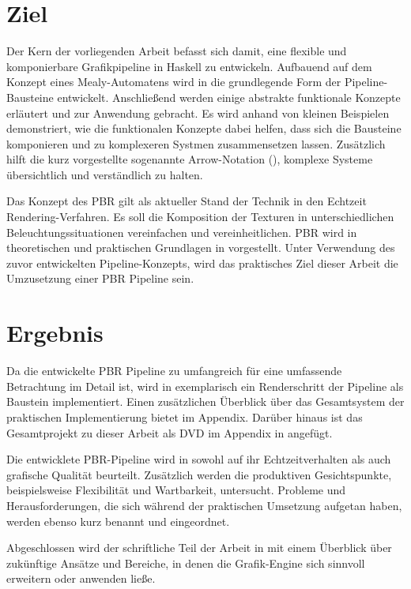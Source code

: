 \section{Ziel}

Der Kern der vorliegenden Arbeit befasst sich damit, eine flexible und komponierbare Grafikpipeline in Haskell zu entwickeln. Aufbauend auf dem Konzept eines Mealy-Automatens wird in  die grundlegende Form der Pipeline-Bausteine entwickelt. Anschließend werden einige abstrakte funktionale Konzepte erläutert und zur Anwendung gebracht. Es wird anhand von kleinen Beispielen demonstriert, wie die funktionalen Konzepte dabei helfen, dass sich die Bausteine komponieren und zu komplexeren Systmen zusammensetzen lassen. Zusätzlich hilft die kurz vorgestellte sogenannte Arrow-Notation (), komplexe Systeme übersichtlich und verständlich zu halten.

Das Konzept des \acl{PBR} gilt als aktueller Stand der Technik in den Echtzeit Rendering-Verfahren. Es soll die Komposition der Texturen in unterschiedlichen Beleuchtungssituationen vereinfachen und vereinheitlichen. \ac{PBR} wird in theoretischen und praktischen Grundlagen in  vorgestellt. Unter Verwendung des zuvor entwickelten Pipeline-Konzepts, wird das praktisches Ziel dieser Arbeit die Umzusetzung einer \ac{PBR} Pipeline sein.

\section{Ergebnis}
Da die entwickelte \ac{PBR} Pipeline zu umfangreich für eine umfassende Betrachtung im Detail ist, wird in  exemplarisch ein Renderschritt der Pipeline als Baustein implementiert. Einen zusätzlichen Überblick über das Gesamtsystem der praktischen Implementierung bietet  im Appendix. Darüber hinaus ist das Gesamtprojekt zu dieser Arbeit als DVD im Appendix in  angefügt.

Die entwicklete \ac{PBR}-Pipeline wird in  sowohl auf ihr Echtzeitverhalten als auch grafische Qualität beurteilt. Zusätzlich werden die produktiven Gesichtspunkte, beispielsweise Flexibilität und Wartbarkeit, untersucht. Probleme und Herausforderungen, die sich während der praktischen Umsetzung aufgetan haben, werden ebenso kurz benannt und eingeordnet.

Abgeschlossen wird der schriftliche Teil der Arbeit in  mit einem Überblick über zukünftige Ansätze und Bereiche, in denen die Grafik-Engine sich sinnvoll erweitern oder anwenden ließe.

